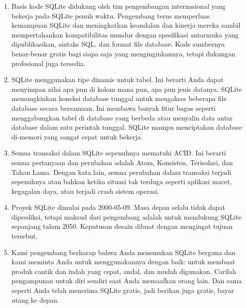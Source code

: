 \begin{enumerate}
\begin{enumerate}
				\item Basis kode SQLite didukung oleh tim pengembangan internasional yang bekerja pada SQLite penuh waktu. Pengembang terus memperluas kemampuan SQLite dan meningkatkan keandalan dan kinerja mereka sambil mempertahankan kompatibilitas mundur dengan spesifikasi antarmuka yang dipublikasikan, sintaks SQL, dan format file database. Kode sumbernya benar-benar gratis bagi siapa saja yang menginginkannya, tetapi dukungan profesional juga tersedia.
				\item SQLite menggunakan tipe dinamis untuk tabel. Ini berarti Anda dapat menyimpan nilai apa pun di kolom mana pun, apa pun jenis datanya. SQLite memungkinkan koneksi database tunggal untuk mengakses beberapa file database secara bersamaan. Ini membawa banyak fitur bagus seperti menggabungkan tabel di database yang berbeda atau menyalin data antar database dalam satu perintah tunggal. SQLite mampu menciptakan database di-memori yang sangat cepat untuk bekerja.
				\item Semua transaksi dalam SQLite sepenuhnya mematuhi ACID. Ini berarti semua pertanyaan dan perubahan adalah Atom, Konsisten, Terisolasi, dan Tahan Lama. Dengan kata lain, semua perubahan dalam transaksi terjadi sepenuhnya atau bahkan ketika situasi tak terduga seperti aplikasi macet, kegagalan daya, atau terjadi crash sistem operasi.
				\item Proyek SQLite dimulai pada 2000-05-09. Masa depan selalu tidak dapat diprediksi, tetapi maksud dari pengembang adalah untuk mendukung SQLite sepanjang tahun 2050. Keputusan desain dibuat dengan mengingat tujuan tersebut.
				\item Kami pengembang berharap bahwa Anda menemukan SQLite berguna dan kami meminta Anda untuk menggunakannya dengan baik: untuk membuat produk cantik dan indah yang cepat, andal, dan mudah digunakan. Carilah pengampunan untuk diri sendiri saat Anda memaafkan orang lain. Dan sama seperti Anda telah menerima SQLite gratis, jadi berikan juga gratis, bayar utang ke depan.

			\end{enumerate}
			


\cite{owens2010sqlite}
\cite{newman2004sqlite}
\cite{kreibich2010using}
\cite{kang2013x}
\cite{jeon2012recovery}
\cite{lee2012creating}


\end{enumerate}
